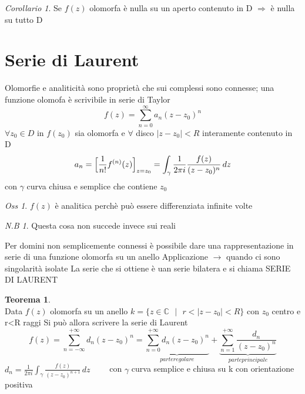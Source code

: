 \documentclass[a4paper,11pt]{report}
\theoremstyle{remark}
\newtheorem*{oss}{Oss}
\newtheorem*{nb}{N.B}
\newtheorem*{coro}{Corollario}
\theoremstyle{definition}
\newtheorem*{teo}{Teorema}
\begin{document}
	\begin{coro}
		Se $f(z)$ olomorfa è nulla su un aperto contenuto in D $\Rightarrow$ è nulla su tutto D
	\end{coro} 

	\section{Serie di Laurent}
	Olomorfie e analiticità sono proprietà che sui complessi sono connesse; una funzione olomofa è scrivibile in serie di Taylor
	\[ \label{eq:taylor}
	f(z) =\displaystyle \sum_{n=0}^{\infty} a_n(z-z_0)^n
	\]
	$\forall z_0 \in D \mbox{ in } f(z_0)$ sia olomorfa e $\forall$ disco $|z-z_0|<R$ interamente contenuto in D
	\[a_n = \Bigl[\frac{1}{n!} f^{(n)}(z)\Bigr]_{z=z_0} = \int_\gamma \frac{1}{2\pi i} \frac{f(z)}{(z-z_0)^n} \,dz\] 
	con $\gamma$ curva chiusa e semplice che contiene $z_0$
	
	\begin{oss}
		$f(z)$ è analitica perchè può essere differenziata infinite volte
	\end{oss}

	\begin{nb}
		Questa cosa non succede invece sui reali
	\end{nb}

	\noindent Per domini non semplicemente connessi è possibile dare una rappresentazione in serie di una funzione olomorfa su un anello \newline
	Applicazione $\rightarrow$ quando ci sono singolarità isolate \newline
	La serie che si ottiene è uan serie bilatera e si chiama SERIE DI LAURENT
	
	\begin{teo}\hfil\\
		Data $f(z)$ olomorfa su un anello $k = \{{z \in \mathbb{C} \mbox{ }| \mbox{ } r< |z-z_0|<R}\} \mbox{ con } z_0$ centro e r<R raggi \newline
		Si può allora scrivere la serie di Laurent 
		\begin{equation}
			f(z) = \sum_{n=-\infty}^{+\infty} d_n (z-z_0)^n = \underbrace{\sum_{n=0}^{+\infty} d_n(z-z_0)^n}_{parte regolare}  + \underbrace{\sum_{n=1}^{+\infty} \frac{d_n}{(z-z_0)^n}}_{parte principale}
		\end{equation}
		$d_n = \frac{1}{2\pi i } \int_\gamma \frac{f(z)}{(z-z_0)^{n+1}}\,dz \qquad$ con $\gamma$ curva semplice e chiusa su k con orientazione positiva
	\end{teo}
\end{document}
